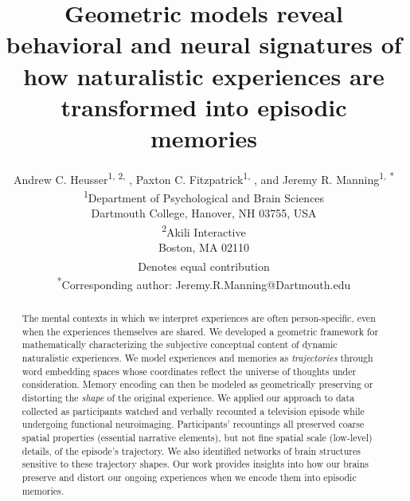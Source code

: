\documentclass[10pt]{article}
\title{Geometric models reveal behavioral and neural signatures of how naturalistic experiences are transformed into episodic memories}
\author{Andrew C. Heusser\textsuperscript{1, 2, \textdagger}, Paxton C. Fitzpatrick\textsuperscript{1, \textdagger}, and Jeremy R. Manning\textsuperscript{1, *}\\\textsuperscript{1}Department of Psychological and Brain Sciences\\Dartmouth College, Hanover, NH 03755, USA\\\textsuperscript{2}Akili Interactive\\Boston, MA 02110\\\textsuperscript{\textdagger}Denotes equal contribution\\\textsuperscript{*}Corresponding author: Jeremy.R.Manning@Dartmouth.edu}
\begin{document}
\begin{titlepage}
  \maketitle
  \end{titlepage}

\begin{abstract}
The mental contexts in which we interpret experiences are often person-specific, even when the experiences themselves are shared. We developed a geometric framework for mathematically characterizing the subjective conceptual content of dynamic naturalistic experiences. We model experiences and memories as \textit{trajectories} through word embedding spaces whose coordinates reflect the universe of thoughts under consideration. Memory encoding can then be modeled as geometrically preserving or distorting the \textit{shape} of the original experience. We applied our approach to data collected as participants watched and verbally recounted a television episode while undergoing functional neuroimaging. Participants’ recountings all preserved coarse spatial properties (essential narrative elements), but not fine spatial scale (low-level) details, of the episode’s trajectory. We also identified networks of brain structures sensitive to these trajectory shapes. Our work provides insights into how our brains preserve and distort our ongoing experiences when we encode them into episodic memories.
\end{abstract}
\end{document}
